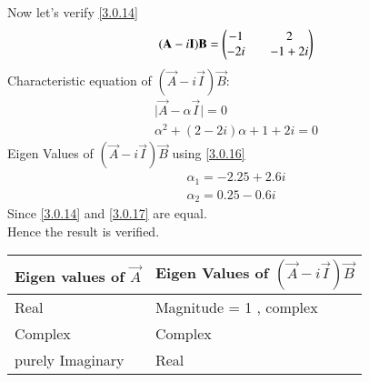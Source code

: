 \documentclass[journal,12pt,twocolumn]{IEEEtran}
\begin{document}
 Now let's verify \eqref{3.0.14}
 \begin{equation}\label{3.0.15}
 (\mathbf{A}-i\mathbf{I})\mathbf{B} = \begin{pmatrix}-1 && 2 \\ -2i && -1+2i\end{pmatrix}
 \end{equation}
 Characteristic equation of $(\vec{A}-i\vec{I})\vec{B}$:
 \begin{equation}\label{3.0.16}
 \begin{split}
 \vert\vec{A}-\alpha\vec{I}\vert = 0\\
 \alpha^2 + (2-2i)\alpha + 1 + 2i = 0
 \end{split}
 \end{equation}
 Eigen Values of $(\vec{A}-i\vec{I})\vec{B}$ using \eqref{3.0.16}  
 \begin{equation}\label{3.0.17}
 \begin{split}
 \alpha_1 = -2.25 + 2.6i\\
 \alpha_2 = 0.25 - 0.6i
 \end{split}
 \end{equation}
 Since \eqref{3.0.14} and \eqref{3.0.17} are equal.\\
 Hence the result is verified.
\begin{center}
\begin{tabular}{ | m{5cm}| m{5cm} | } 
\hline
Eigen values of $\vec{A}$ & Eigen Values of $(\vec{A}-i\vec{I})\vec{B}$ \\ 
\hline
Real & Magnitude = 1 , complex \\ 
\hline
Complex & Complex \\ 
\hline
purely Imaginary & Real \\ 
\hline
\end{tabular}
\end{center}
\end{document}
